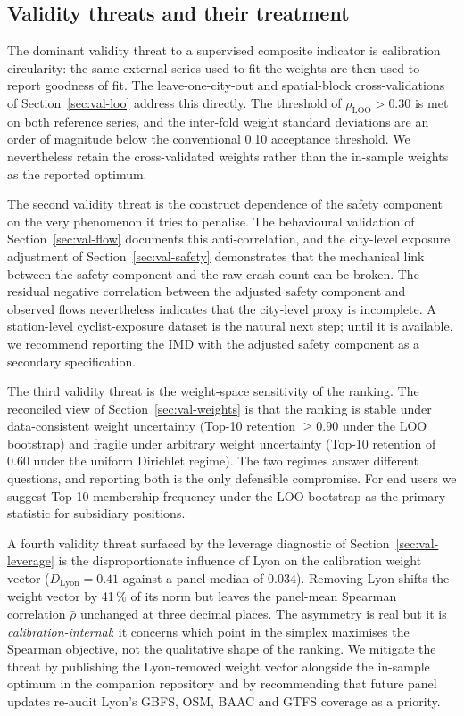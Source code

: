 \documentclass[11pt,a4paper]{article}
\begin{document}
\subsection{Validity threats and their treatment}

The dominant validity threat to a supervised composite indicator
is calibration circularity: the same external series used to fit
the weights are then used to report goodness of fit. The
leave-one-city-out and spatial-block cross-validations of
Section~\ref{sec:val-loo} address this directly. The threshold of
$\rho_{\text{LOO}} > 0.30$ is met on both reference series, and
the inter-fold weight standard deviations are an order of
magnitude below the conventional 0.10 acceptance threshold. We
nevertheless retain the cross-validated weights rather than the
in-sample weights as the reported optimum.

The second validity threat is the construct dependence of the
safety component on the very phenomenon it tries to penalise.
The behavioural validation of Section~\ref{sec:val-flow}
documents this anti-correlation, and the city-level
exposure adjustment of Section~\ref{sec:val-safety} demonstrates
that the mechanical link between the safety component and the
raw crash count can be broken. The residual negative correlation
between the adjusted safety component and observed flows
nevertheless indicates that the city-level proxy is incomplete.
A station-level cyclist-exposure dataset is the natural next
step; until it is available, we recommend reporting the IMD with
the adjusted safety component as a secondary specification.

The third validity threat is the weight-space sensitivity of the
ranking. The reconciled view of
Section~\ref{sec:val-weights} is that the ranking is stable under
data-consistent weight uncertainty (Top-10 retention $\geq 0.90$
under the LOO bootstrap) and fragile under arbitrary weight
uncertainty (Top-10 retention of 0.60 under the uniform Dirichlet
regime). The two regimes answer different questions, and reporting
both is the only defensible compromise. For end users we suggest
Top-10 membership frequency under the LOO bootstrap as the
primary statistic for subsidiary positions.

A fourth validity threat surfaced by the leverage diagnostic of
Section~\ref{sec:val-leverage} is the disproportionate influence
of Lyon on the calibration weight vector
($D_{\text{Lyon}} = 0.41$ against a panel median of $0.034$).
Removing Lyon shifts the weight vector by 41\,\% of its norm but
leaves the panel-mean Spearman correlation $\bar\rho$ unchanged
at three decimal places. The asymmetry is real but it is
\emph{calibration-internal}: it concerns which point in the
simplex maximises the Spearman objective, not the qualitative
shape of the ranking. We mitigate the threat by publishing the
Lyon-removed weight vector alongside the in-sample optimum in
the companion repository and by recommending that future panel
updates re-audit Lyon's GBFS, OSM, BAAC and GTFS coverage as a
priority.
\end{document}

